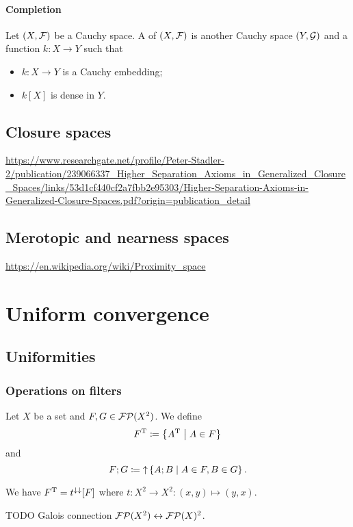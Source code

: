 \subsubsection{Completion}
\begin{definition}
Let $\left( X, \mathcal{F} \right)$ be a Cauchy space. A  of $\left( X, \mathcal{F} \right)$ is another Cauchy space $\left( Y, \mathcal{G} \right)$ and a function $k: X\to Y$ such that
\begin{itemize}
\item $k: X\to Y$ is a Cauchy embedding;
\item $k[X]$ is dense in $Y$.
\end{itemize}
\end{definition}

\section{Closure spaces}
\url{https://www.researchgate.net/profile/Peter-Stadler-2/publication/239066337_Higher_Separation_Axioms_in_Generalized_Closure_Spaces/links/53d1cf440cf2a7fbb2e95303/Higher-Separation-Axioms-in-Generalized-Closure-Spaces.pdf?origin=publication_detail}

\section{Merotopic and nearness spaces}
\url{https://en.wikipedia.org/wiki/Proximity_space}

\chapter{Uniform convergence}
\section{Uniformities}
\subsection{Operations on filters}
\begin{definition}
Let $X$ be a set and $F,G\in\operatorname{\mathcal{FP}}(X^2)$. We define
\[ F^{\mathrm{T}} \coloneqq \left\{ A^{\mathrm{T}} \;\middle|\; A\in F \right\}  \]
and
\[ F;G \coloneqq \operatorname{\uparrow} \left\{ A;B \;\middle|\; A\in F, B\in G \right\}. \]
\end{definition}

We have $F^{\mathrm{T}} = t^{\downarrow\downarrow}[F]$ where $t: X^2 \to X^2: (x,y)\mapsto (y,x)$.

TODO Galois connection $\operatorname{\mathcal{FP}}(X^2) \leftrightarrow \operatorname{\mathcal{FP}}(X)^2$.

